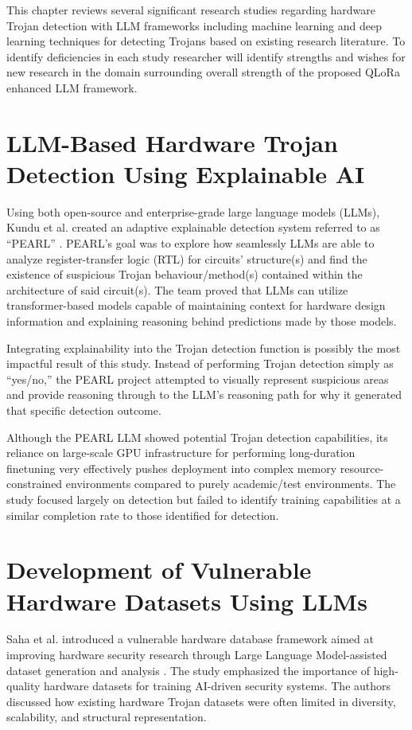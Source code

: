 \documentclass[12pt,a4paper]{report}
\begin{document}
This chapter reviews several significant research studies regarding hardware Trojan detection with LLM frameworks including machine learning and deep learning techniques for detecting Trojans based on existing research literature. To identify deficiencies in each study researcher will identify strengths and wishes for new research in the domain surrounding overall strength of the proposed QLoRa enhanced LLM framework.

\section{LLM-Based Hardware Trojan Detection Using Explainable AI}

Using both open-source and enterprise-grade large language models (LLMs), Kundu et al. created an adaptive explainable detection system referred to as “PEARL” \cite{ref1}. PEARL’s goal was to explore how seamlessly LLMs are able to analyze register-transfer logic (RTL) for circuits’ structure(s) and find the existence of suspicious Trojan behaviour/method(s) contained within the architecture of said circuit(s). The team proved that LLMs can utilize transformer-based models capable of maintaining context for hardware design information and explaining reasoning behind predictions made by those models.

Integrating explainability into the Trojan detection function is possibly the most impactful result of this study. Instead of performing Trojan detection simply as “yes/no,” the PEARL project attempted to visually represent suspicious areas and provide reasoning through to the LLM’s reasoning path for why it generated that specific detection outcome.

Although the PEARL LLM showed potential Trojan detection capabilities, its reliance on large-scale GPU infrastructure for performing long-duration finetuning very effectively pushes deployment into complex memory resource-constrained environments compared to purely academic/test environments. The study focused largely on detection but failed to identify training capabilities at a similar completion rate to those identified for detection.

\section{Development of Vulnerable Hardware Datasets Using LLMs}

Saha et al. introduced a vulnerable hardware database framework aimed at improving hardware security research through Large Language Model-assisted dataset generation and analysis \cite{ref2}. The study emphasized the importance of high-quality hardware datasets for training AI-driven security systems. The authors discussed how existing hardware Trojan datasets were often limited in diversity, scalability, and structural representation.
\end{document}
